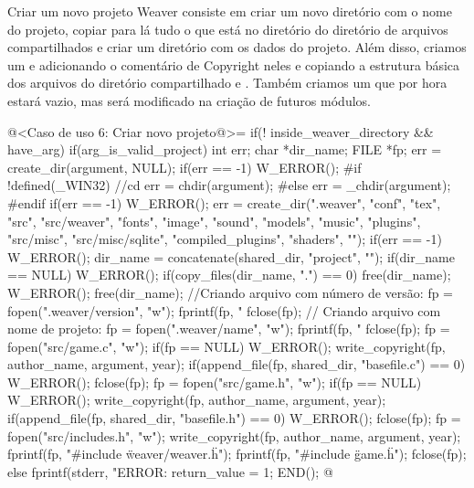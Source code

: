 {

Criar um novo projeto Weaver consiste em criar um novo diretório com o
nome do projeto, copiar para lá tudo o que está no diretório
 do diretório de arquivos compartilhados e criar um
diretório  com os dados do projeto. Além disso,
criamos um  e  adicionando o
comentário de Copyright neles e copiando a estrutura básica dos
arquivos do diretório compartilhado  e
. Também criamos um
 que por hora estará vazio, mas será modificado
na criação de futuros módulos.

\iniciocodigo
@<Caso de uso 6: Criar novo projeto@>=
if(! inside_weaver_directory && have_arg){
  if(arg_is_valid_project){
    int err;
    char *dir_name;
    FILE *fp;
    err = create_dir(argument, NULL);
    if(err == -1) W_ERROR();
#if !defined(_WIN32) //cd
    err = chdir(argument);
#else
    err = _chdir(argument);
#endif
    if(err == -1) W_ERROR();
    err = create_dir(".weaver", "conf", "tex", "src", "src/weaver",
                     "fonts", "image", "sound", "models", "music",
                     "plugins", "src/misc", "src/misc/sqlite",
                     "compiled_plugins", "shaders", "");
    if(err == -1) W_ERROR();
    dir_name = concatenate(shared_dir, "project", "");
    if(dir_name == NULL) W_ERROR();
    if(copy_files(dir_name, ".") == 0){
      free(dir_name);
      W_ERROR();
    }
    free(dir_name); //Criando arquivo com número de versão:
    fp = fopen(".weaver/version", "w");
    fprintf(fp, "%
    fclose(fp); // Criando arquivo com nome de projeto:
    fp = fopen(".weaver/name", "w");
    fprintf(fp, "%
    fclose(fp);
    fp = fopen("src/game.c", "w");
    if(fp == NULL) W_ERROR();
    write_copyright(fp, author_name, argument, year);
    if(append_file(fp, shared_dir, "basefile.c") == 0) W_ERROR();
    fclose(fp);
    fp = fopen("src/game.h", "w");
    if(fp == NULL) W_ERROR();
    write_copyright(fp, author_name, argument, year);
    if(append_file(fp, shared_dir, "basefile.h") == 0) W_ERROR();
    fclose(fp);
    fp = fopen("src/includes.h", "w");
    write_copyright(fp, author_name, argument, year);
    fprintf(fp, "\n#include \"weaver/weaver.h\"\n");
    fprintf(fp, "\n#include \"game.h\"\n");
    fclose(fp);
  }
  else{
    fprintf(stderr, "ERROR: %
    return_value = 1;
  }
  END();
}
@
\fimcodigo

}
